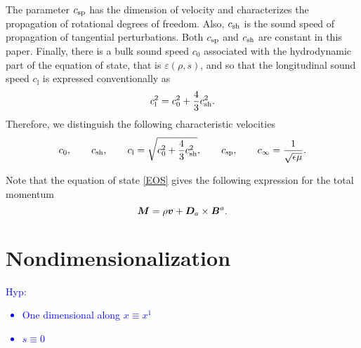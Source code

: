\documentclass[
10pt, %
a4paper, %
oneside, %
headinclude,footinclude, %
table
]{scrartcl}
\begin{document}
The parameter $ c_\text{sp} $ has the dimension of velocity and characterizes 
the propagation of rotational degrees of freedom. Also, $ c_\text{sh} $ is the sound 
speed of propagation of tangential perturbations. Both $ c_\text{sp} $ and $ c_\text{sh} $ 
are constant in this paper. Finally, there is a bulk 
sound speed $ c_0 $ associated with the hydrodynamic part of the equation of 
state, that is $ \varepsilon(\rho,s) $, and so that the longitudinal sound 
speed $ c_\text{l} $ is expressed conventionally as
\begin{equation}\label{long.sound}
c_\text{l}^2 = c_0^2 + \frac43 c_\text{sh}^2. 
\end{equation}
Therefore, we distinguish the following  characteristic velocities
\begin{equation}\label{key}
c_0, \qquad c_\text{sh}, \qquad c_\text{l} = \sqrt{c_0^2 + \frac43 c_\text{sh}^2}, 
\qquad c_\text{sp}, \qquad c_\infty = \frac{1}{\sqrt{\epsilon\mu}}.
\end{equation}

Note that the equation of state \eqref{EOS} gives the following expression for 
the total momentum 
\begin{equation}\label{momentum.total}
\bm{M} =\rho \bm{v} + \bm{D}_a\times\bm{B}^a.
\end{equation}


\section{Nondimensionalization}
\textcolor{blue}{Hyp: 
\begin{itemize}
\item One dimensional along $x\equiv x^{1}$ 
\item $s\equiv 0$
\end{itemize}}
\end{document}
